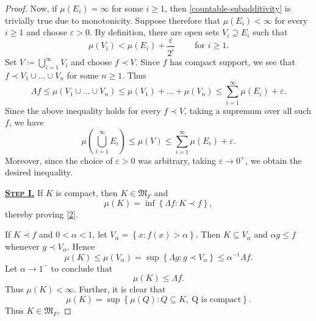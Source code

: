 \documentclass[11pt]{article}
\theoremstyle{thmstyle}
\theoremstyle{defstyle}
\newcommand{\frakM}{\mathfrak{M}} %
\renewcommand{\le}{\leqslant}
\renewcommand{\ge}{\geqslant}
\begin{document}
\begin{proof}
    Now, if $\mu(E_i) = \infty$ for some $i\ge 1$, then \eqref{countable-subadditivity} is trivially true due to monotonicity. Suppose therefore that $\mu(E_i) < \infty$ for every $i\ge 1$ and choose $\varepsilon > 0$. By definition, there are open sets $V_i\supseteq E_i$ such that 
    \begin{equation*}
        \mu(V_i) < \mu(E_i) + \frac{\varepsilon}{2^i}\qquad\text{ for }i\ge 1.
    \end{equation*}
    Set $V\coloneq\bigcup_{i = 1}^\infty V_i$ and choose $f\prec V$. Since $f$ has compact support, we see that $f\prec V_1\cup\dots\cup V_n$ for some $n\ge 1$. Thus 
    \begin{equation*}
        \Lambda f\le \mu(V_1\cup\dots\cup V_n)\le \mu(V_1) + \dots + \mu(V_n)\le\sum_{i = 1}^\infty\mu(E_i) + \varepsilon.
    \end{equation*}
    Since the above inequality holds for every $f\prec V$, taking a supremum over all such $f$, we have 
    \begin{equation*}
        \mu\left(\bigcup_{i = 1}^\infty E_i\right)\le\mu(V)\le\sum_{i = 1}^\infty\mu(E_i) + \varepsilon.
    \end{equation*}
    Moreover, since the choice of $\varepsilon > 0$ was arbitrary, taking $\varepsilon\to 0^+$, we obtain the desired inequality.

    \vspace{0.5 cm}

    \noindent\underline{\textbf{\textsc{Step I.}}} If $K$ is compact, then $K\in\frakM_F$ and 
    \begin{equation*}
        \mu(K) = \inf\left\{\Lambda f\colon K\prec f\right\},
    \end{equation*}
    thereby proving \ref{2}.

    If $K\prec f$ and $0 < \alpha < 1$, let $V_\alpha = \left\{x\colon f(x) > \alpha\right\}$. Then $K\subseteq V_\alpha$ and $\alpha g\le f$ whenever $g\prec V_\alpha$. Hence 
    \begin{equation*}
        \mu(K)\le \mu(V_\alpha) = \sup\left\{\Lambda g\colon g\prec V_\alpha\right\}\le\alpha^{-1}\Lambda f.
    \end{equation*}
    Let $\alpha\to 1^{-}$ to conclude that 
    \begin{equation*}
        \mu(K)\le\Lambda f.
    \end{equation*}
    Thus $\mu(K) < \infty$. Further, it is clear that 
    \begin{equation*}
        \mu(K) = \sup\left\{\mu(Q)\colon Q\subseteq K,~\text{Q is compact}\right\}.
    \end{equation*}
    Thus $K\in\frakM_F$.


\end{proof}
\end{document}
